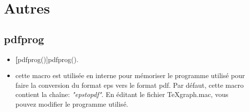 \section{Autres}

\subsection{pdfprog}
\begin{itemize}
 \item \util \textbf[pdfprog()]{pdfprog()}.
 \item \desc cette macro est utilisée en interne pour mémoriser le programme utilisé pour faire la conversion
 du format eps vers le format pdf. Par défaut, cette macro contient la chaîne: \textsl{"epstopdf"}. En éditant le fichier TeXgraph.mac, vous pouvez modifier le programme utilisé.
\end{itemize}
